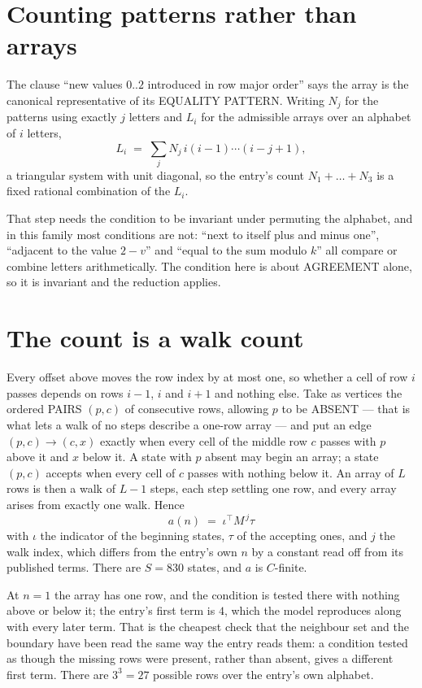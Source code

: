 \documentclass[11pt,a4paper]{article}
\theoremstyle{plain}
\theoremstyle{definition}
\begin{document}
\section{Counting patterns rather than arrays}

The clause ``new values $0..2$ introduced in row major order'' says the array is the
canonical representative of its EQUALITY PATTERN. Writing $N_j$ for the patterns using exactly
$j$ letters and $L_i$ for the admissible arrays over an alphabet of $i$ letters,
\[
L_i\;=\;\sum_j N_j\,i(i-1)\cdots(i-j+1),
\]
a triangular system with unit diagonal, so the entry's count $N_1+\dots+N_{3}$ is a
fixed rational combination of the $L_i$.

That step needs the condition to be invariant under permuting the alphabet, and in this family
most conditions are not: ``next to itself plus and minus one'', ``adjacent to the value
$2-v$'' and ``equal to the sum modulo $k$'' all compare or combine letters arithmetically.
The condition here is about AGREEMENT alone, so it is invariant and the reduction applies.

\section{The count is a walk count}

Every offset above moves the row index by at most one, so whether a cell of row $i$ passes
depends on rows $i-1$, $i$ and $i+1$ and nothing else. Take as vertices the ordered PAIRS
$(p,c)$ of consecutive rows, allowing $p$ to be ABSENT --- that is what lets a walk of no steps
describe a one-row array --- and put an edge $(p,c)\to(c,x)$ exactly when every cell of the
middle row $c$ passes with $p$ above it and $x$ below it. A state with $p$ absent may begin an
array; a state $(p,c)$ accepts when every cell of $c$ passes with nothing below it. An array of
$L$ rows is then a walk of $L-1$ steps, each step settling one row, and every array arises from
exactly one walk. Hence
\[
a(n)\;=\;\iota^{\!\top}M^{\,j}\tau
\]
with $\iota$ the indicator of the beginning states, $\tau$ of the accepting ones, and $j$ the
walk index, which differs from the entry's own $n$ by a constant read off from its published
terms. There are $S=830$ states, and $a$ is $C$-finite.

At $n=1$ the array has one row, and
the condition is tested there with nothing above or below it; the entry's first term is
$4$, which the model reproduces along with every later term. That is the cheapest check
that the neighbour set and the boundary have been read the same way the entry reads them: a
condition tested as though the missing rows were present, rather than absent, gives a different
first term. There are $3^{3}=27$ possible rows over the entry's own alphabet.
\end{document}
